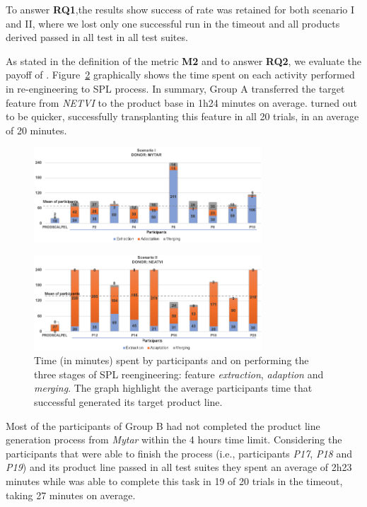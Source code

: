 \begin{framed}
\noindent To answer \textbf{RQ1},the results show success of  rate was retained for both scenario I and II, where we lost only one successful run in the timeout and all products derived passed in all test in all test suites.  
\end{framed}

As stated in the definition of the metric \textbf{M2} and to answer \textbf{RQ2}, we evaluate the payoff of \FOUNDRY. Figure~\ref{fig:experiment_result_time_II} graphically shows the time spent on each activity performed in re-engineering to SPL process. In summary, Group A transferred the target feature from \emph{NETVI} to the product base in 1h24 minutes on average. \autoscalpel turned out to be quicker, successfully transplanting this feature in all 20 trials, in an average of 20 minutes.

\begin{figure}[t]
	\centering \includegraphics[width=8.5cm]{images/experiment_result-SC1-4.png}
	\label{fig:experiment_result_time_I}
\end{figure} 
\begin{figure}[t]
	\centering \includegraphics[width=8.5cm]{images/experiment_result-SC2-4.png}
	\centering \caption{Time (in minutes) spent by participants and \autoscalpel on performing the three stages of SPL reengineering: feature \emph{extraction}, \emph{adaption} and \emph{merging}. The graph highlight the average participants time that successful generated its target product line.} 
	\label{fig:experiment_result_time_II}
\end{figure} 

Most of the participants of Group B had not completed the product line generation process from \emph{Mytar}  within the 4 hours time limit. Considering the participants that were able to finish the process (i.e., participants \emph{P17}, \emph{P18} and \emph{P19}) and its product line passed in all test suites they spent an average of 2h23 minutes while \autoscalpel was able to complete this task in 19 of 20 trials in the timeout, taking 27 minutes on average.

